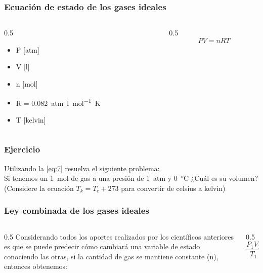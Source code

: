 \documentclass[11pt, aspectratio=169, xcolor=table]{beamer}
\begin{document}
\begin{frame}
  \frametitle{Ecuación de estado de los gases ideales}
  \begin{columns}
    \begin{column}{0.5\textwidth}
      \begin{itemize}
        \item P [\unit{atm}]
        \item V [\unit{\litre}]
        \item n [\unit{\mole}]
        \item R = \qty{0,082}{atm.\litre\per\mole\kelvin}
        \item T [\unit{kelvin}]
      \end{itemize}
    \end{column}
    \begin{column}{0.5\textwidth}
      \begin{equation}
        \label{eq:7}
        PV = nRT
      \end{equation}
    \end{column}
  \end{columns}
\end{frame}

\begin{frame}
  \frametitle{Ejercicio}
\justifying
  Utilizando la \eqref{eq:7} resuelva el siguiente problema:
  \\\vspace{1cm}
  Si tenemos un \qty{1}{\mole} de gas a una presión de \qty{1}{atm} y \qty{0}{\degreeCelsius} ¿Cuál es su volumen? (Considere la ecuación $T_k = T_c + 273$ para convertir de celsius a kelvin)
\end{frame}

\begin{frame}
  \frametitle{Ley combinada de los gases ideales}
  \begin{columns}
    \begin{column}{0.5\textwidth}
\justifying
      Considerando todos los aportes realizados por los científicos anteriores es que se puede predecir cómo cambiará una variable de estado conociendo las otras, si la cantidad de gas se mantiene constante (n), entonces obtenemos:
    \end{column}
    \begin{column}{0.5\textwidth}
      \begin{equation}
        \label{eq:8}
        \frac{P_1V_1}{T_1} = \frac{P_2V_2}{T_2}
      \end{equation}
    \end{column}
  \end{columns}
\end{frame}
\end{document}
